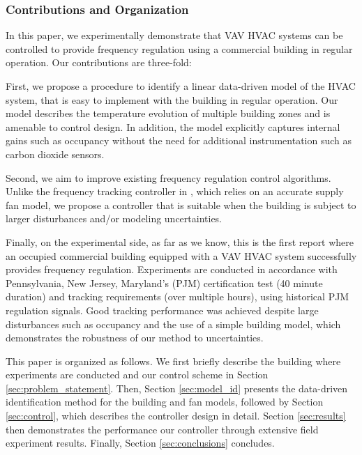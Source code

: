 
\subsubsection{Contributions and Organization}

In this paper, we experimentally demonstrate that VAV HVAC systems can be controlled to provide frequency regulation using a commercial building in regular operation.
Our contributions are three-fold:

First, we propose a procedure to identify a linear data-driven model of the HVAC system, that is easy to implement with the building in regular operation. 
Our model describes the temperature evolution of multiple building zones and is amenable to control design.
In addition, the model explicitly captures internal gains such as occupancy without the need for additional instrumentation such as carbon dioxide sensors.

Second, we aim to improve existing frequency regulation control algorithms.
Unlike the frequency tracking controller in \cite{Vrettos:2016flexlab1}, which relies on an accurate supply fan model, we propose a controller that is suitable when the building is subject to larger disturbances and/or modeling uncertainties. 

Finally, on the experimental side, as far as we know, this is the first report where an occupied commercial building equipped with a VAV HVAC system successfully provides frequency regulation.
Experiments are conducted in accordance with Pennsylvania, New Jersey, Maryland's (PJM) certification test (40 minute duration) and tracking requirements (over multiple hours), using historical PJM regulation signals.  
Good tracking performance was achieved despite large disturbances such as occupancy and the use of a simple building model, which demonstrates the robustness of our method to uncertainties.

This paper is organized as follows. We first briefly describe the building where experiments are conducted and our control scheme in Section \ref{sec:problem_statement}. Then, Section \ref{sec:model_id} presents the data-driven identification method for the building and fan models, followed by Section \ref{sec:control}, which describes the controller design in detail. Section \ref{sec:results} then demonstrates the performance our controller through extensive field experiment results.
Finally, Section \ref{sec:conclusions} concludes.












